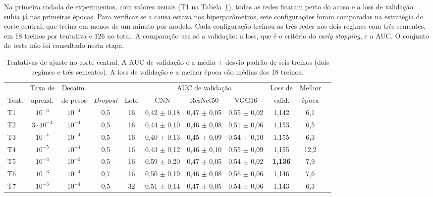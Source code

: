 \documentclass[12pt]{article}
\begin{document}
Na primeira rodada de experimentos, com valores usuais (T1 na Tabela~\ref{tab:ajuste}), todas as redes
ficaram perto do acaso e a loss de validação subia já nas primeiras épocas. Para verificar se a causa
estava nos hiperparâmetros, sete configurações foram comparadas na estratégia do corte central, que
treina em menos de um minuto por modelo. Cada configuração treinou as três redes nos dois regimes com
três sementes, em 18 treinos por tentativa e 126 no total. A comparação usa só a validação: a loss, que
é o critério do \textit{early stopping}, e a AUC. O conjunto de teste não foi consultado nesta etapa.

\begin{table}[ht]
\centering
\caption{Tentativas de ajuste no corte central. A AUC de validação é a média $\pm$ desvio padrão de seis
treinos (dois regimes e três sementes). A loss de validação e a melhor época são médias dos 18 treinos.}
\label{tab:ajuste}
\footnotesize
\setlength{\tabcolsep}{3.5pt}
\begin{tabular}{@{}lcccccccccc@{}}
\toprule
 & Taxa de & Decaim. & & & \multicolumn{3}{c}{AUC de validação} & Loss de & Melhor \\
\cmidrule(lr){6-8}
Tent. & aprend. & de pesos & \textit{Dropout} & Lote & CNN & ResNet50 & VGG16 & valid. & época \\
\midrule
T1 & $10^{-3}$ & $10^{-4}$ & 0,5 & 16 & 0,42 $\pm$ 0,18 & 0,47 $\pm$ 0,05 & 0,55 $\pm$ 0,02 & 1,142 & 6,1 \\
T2 & $3{\cdot}10^{-4}$ & $10^{-4}$ & 0,5 & 16 & 0,44 $\pm$ 0,10 & 0,46 $\pm$ 0,08 & 0,51 $\pm$ 0,06 & 1,153 & 6,5 \\
T3 & $10^{-4}$ & $10^{-4}$ & 0,5 & 16 & 0,40 $\pm$ 0,13 & 0,45 $\pm$ 0,09 & 0,54 $\pm$ 0,10 & 1,155 & 6,3 \\
T4 & $10^{-5}$ & $10^{-4}$ & 0,5 & 16 & 0,43 $\pm$ 0,12 & 0,46 $\pm$ 0,10 & 0,55 $\pm$ 0,09 & 1,155 & 12,2 \\
\midrule
T5 & $10^{-3}$ & $10^{-2}$ & 0,5 & 16 & 0,59 $\pm$ 0,20 & 0,47 $\pm$ 0,05 & 0,54 $\pm$ 0,02 & \textbf{1,136} & 7,9 \\
T6 & $10^{-3}$ & $10^{-4}$ & 0,7 & 16 & 0,50 $\pm$ 0,19 & 0,46 $\pm$ 0,08 & 0,56 $\pm$ 0,06 & 1,146 & 7,6 \\
T7 & $10^{-3}$ & $10^{-4}$ & 0,5 & 32 & 0,51 $\pm$ 0,14 & 0,47 $\pm$ 0,05 & 0,54 $\pm$ 0,06 & 1,143 & 6,3 \\
\bottomrule
\end{tabular}
\end{table}
\end{document}
